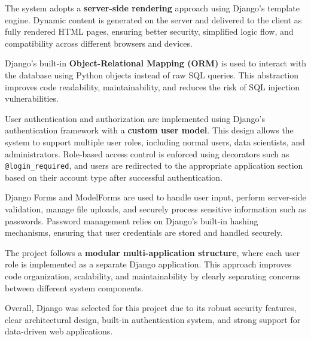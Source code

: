 \documentclass[12pt,oneside]{report}
\begin{document}
The system adopts a \textbf{server-side rendering} approach using Django’s template engine. Dynamic content is generated on the server and delivered to the client as fully rendered HTML pages, ensuring better security, simplified logic flow, and compatibility across different browsers and devices.

Django’s built-in \textbf{Object-Relational Mapping (ORM)} is used to interact with the database using Python objects instead of raw SQL queries. This abstraction improves code readability, maintainability, and reduces the risk of SQL injection vulnerabilities.

User authentication and authorization are implemented using Django’s authentication framework with a \textbf{custom user model}. This design allows the system to support multiple user roles, including normal users, data scientists, and administrators. Role-based access control is enforced using decorators such as \texttt{@login\_required}, and users are redirected to the appropriate application section based on their account type after successful authentication.

Django Forms and ModelForms are used to handle user input, perform server-side validation, manage file uploads, and securely process sensitive information such as passwords. Password management relies on Django’s built-in hashing mechanisms, ensuring that user credentials are stored and handled securely.

The project follows a \textbf{modular multi-application structure}, where each user role is implemented as a separate Django application. This approach improves code organization, scalability, and maintainability by clearly separating concerns between different system components.

Overall, Django was selected for this project due to its robust security features, clear architectural design, built-in authentication system, and strong support for data-driven web applications.
\end{document}
